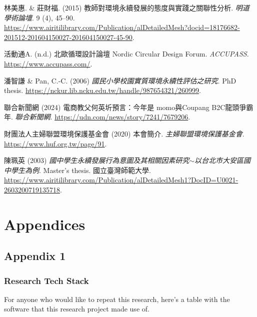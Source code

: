 \documentclass[
  letterpaper,
  DIV=11,
  numbers=noendperiod]{scrartcl}
\newlength{\cslhangindent}
\newenvironment{CSLReferences}[2] %
 {\begin{list}{}{%
  \setlength{\itemindent}{0pt}
  \setlength{\leftmargin}{0pt}
  \setlength{\parsep}{0pt}
  \ifodd #1
   \setlength{\leftmargin}{\cslhangindent}
   \setlength{\itemindent}{-1\cslhangindent}
  \fi
  \setlength{\itemsep}{#2\baselineskip}}}
 {\end{list}}
\begin{document}
\begin{CSLReferences}{0}{1}
林美惠. \& 莊財福. (2015) {教師對環境永續發展的態度與實踐之關聯性分析}.
\emph{明道學術論壇}. 9 (4), 45--90.
\url{https://www.airitilibrary.com/Publication/alDetailedMesh?docid=18176682-201512-201604150027-201604150027-45-90}.

活動通A. (n.d.) 北歐循環設計論壇 {Nordic Circular Design Forum}.
\emph{ACCUPASS}. \url{https://www.accupass.com/}.

潘智謙 \& Pan, C.-C. (2006)
\emph{\emph{國民小學校園實質環境永續性評估之研究}}. PhD thesis.
\url{https://nckur.lib.ncku.edu.tw/handle/987654321/260999}.

聯合新聞網 (2024) {電商教父何英圻預言：今年是 momo與Coupang
B2C龍頭爭霸年}. \emph{聯合新聞網}.
\url{https://udn.com/news/story/7241/7679206}.

財團法人主婦聯盟環境保護基金會 (2020) {本會簡介}.
\emph{主婦聯盟環境保護基金會}. \url{https://www.huf.org.tw/page/91}.

陳珮英 (2003)
\emph{{國中學生永續發展行為意圖及其相關因素研究{\(\sim\)}以台北市大安區國中學生為例}}.
Master's thesis. 國立臺灣師範大學.
\url{https://www.airitilibrary.com/Publication/alDetailedMesh1?DocID=U0021-2603200719135718}.

\end{CSLReferences}

\newpage

\section{Appendices}\label{appendices}

\subsection{Appendix 1}\label{appendix-1}

\subsubsection{Research Tech Stack}\label{research-tech-stack}

For anyone who would like to repeat this research, here's a table with
the software that this research project made use of.
\end{document}
